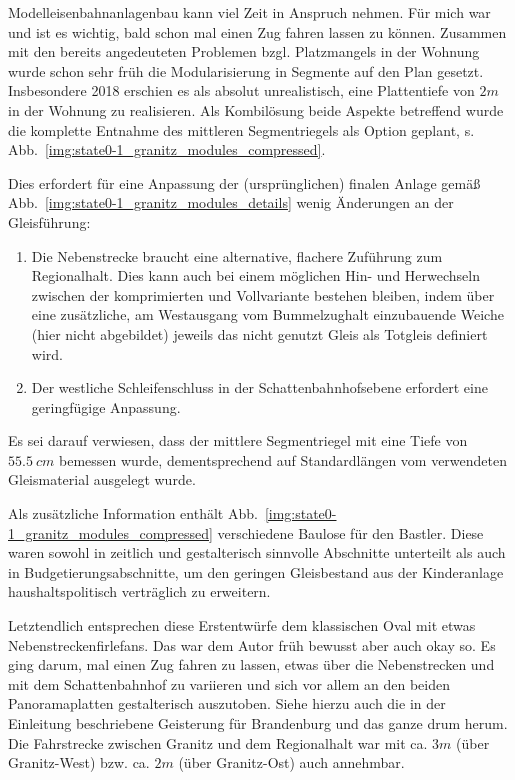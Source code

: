 Modelleisenbahnanlagenbau kann viel Zeit in Anspruch nehmen.
F\"ur mich war und ist es wichtig, bald schon mal einen Zug fahren lassen zu k\"onnen.
Zusammen mit den bereits angedeuteten Problemen bzgl. Platzmangels in der Wohnung wurde schon sehr fr\"uh die Modularisierung in Segmente auf den Plan gesetzt.
Insbesondere 2018 erschien es als absolut unrealistisch, eine Plattentiefe von $2m$ in der Wohnung zu realisieren.
Als Kombil\"osung beide Aspekte betreffend wurde die komplette Entnahme des mittleren Segmentriegels als Option geplant, s. Abb.~\ref{img:state0-1_granitz_modules_compressed}.

Dies erfordert f\"ur eine Anpassung der (urspr\"unglichen) finalen Anlage gem\"a{\ss} Abb.~\ref{img:state0-1_granitz_modules_details} wenig \"Anderungen an der Gleisf\"uhrung:
\begin{enumerate}
	\item Die Nebenstrecke braucht eine alternative, flachere Zuf\"uhrung zum Regionalhalt.
	Dies kann auch bei einem m\"oglichen Hin- und Herwechseln zwischen der komprimierten und Vollvariante bestehen bleiben, indem \"uber eine zus\"atzliche, am Westausgang vom Bummelzughalt einzubauende Weiche (hier nicht abgebildet) jeweils das nicht genutzt Gleis als Totgleis definiert wird.
	\item Der westliche Schleifenschluss in der Schattenbahnhofsebene erfordert eine geringf\"ugige Anpassung.
\end{enumerate}
Es sei darauf verwiesen, dass der mittlere Segmentriegel mit eine Tiefe von $55.5~cm$ bemessen wurde, dementsprechend auf Standardl\"angen vom verwendeten Gleismaterial ausgelegt wurde.

Als zus\"atzliche Information enth\"alt Abb.~\ref{img:state0-1_granitz_modules_compressed} verschiedene Baulose f\"ur den Bastler.
Diese waren sowohl in zeitlich und gestalterisch sinnvolle Abschnitte unterteilt als auch in Budgetierungsabschnitte, um den geringen Gleisbestand aus der Kinderanlage haushaltspolitisch vertr\"aglich zu erweitern.

Letztendlich entsprechen diese Erstentw\"urfe dem klassischen Oval mit etwas Nebenstreckenfirlefans.
Das war dem Autor fr\"uh bewusst aber auch okay so.
Es ging darum, mal einen Zug fahren zu lassen, etwas \"uber die Nebenstrecken und mit dem Schattenbahnhof zu variieren und sich vor allem an den beiden Panoramaplatten gestalterisch auszutoben.
Siehe hierzu auch die in der Einleitung beschriebene Geisterung f\"ur Brandenburg und das ganze drum herum.
Die Fahrstrecke zwischen Granitz und dem Regionalhalt war mit ca. $3m$ (\"uber Granitz-West) bzw. ca. $2m$ (\"uber Granitz-Ost) auch annehmbar.


